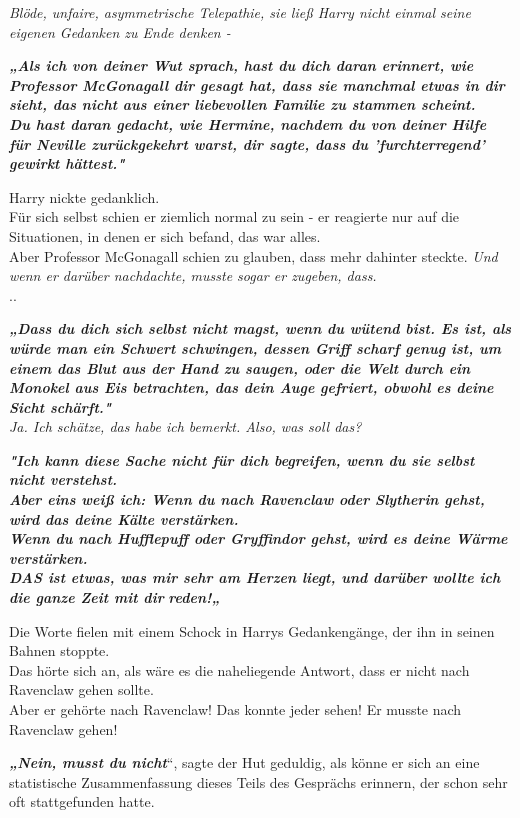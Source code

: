 {\emph{Blöde, unfaire, asymmetrische Telepathie, sie ließ Harry nicht einmal seine eigenen Gedanken zu Ende denken -}

\textbf{\emph{„Als ich von deiner Wut sprach, hast du dich daran erinnert, wie Professor McGonagall dir gesagt hat, dass sie manchmal etwas in dir sieht, das nicht aus einer liebevollen Familie zu stammen scheint.\\ Du hast daran gedacht, wie Hermine, nachdem du von deiner Hilfe für Neville zurückgekehrt warst, dir sagte, dass du 'furchterregend' gewirkt hättest."}}

Harry nickte gedanklich.\\ Für sich selbst schien er ziemlich normal zu sein - er reagierte nur auf die Situationen, in denen er sich befand, das war alles.\\ Aber Professor McGonagall schien zu glauben, dass mehr dahinter steckte. \emph{Und wenn er darüber nachdachte, musste sogar er zugeben, dass.}\\ ..

\textbf{\emph{„Dass du dich sich selbst nicht magst, wenn du wütend bist. Es ist, als würde man ein Schwert schwingen, dessen Griff scharf genug ist, um einem das Blut aus der Hand zu saugen, oder die Welt durch ein Monokel aus Eis betrachten, das dein Auge gefriert, obwohl es deine Sicht schärft."}}\\ \emph{\hfill\break Ja. Ich schätze, das habe ich bemerkt. Also, was soll das?}

\textbf{\emph{"Ich kann diese Sache nicht für dich begreifen, wenn du sie selbst nicht verstehst.\\ Aber eins weiß ich: Wenn du nach Ravenclaw oder Slytherin gehst, wird das deine Kälte verstärken.}}\\ \textbf{\emph{Wenn du nach Hufflepuff oder Gryffindor gehst, wird es deine Wärme verstärken.\\ DAS ist etwas, was mir sehr am Herzen liegt, und darüber wollte ich die ganze Zeit mit dir}} \textbf{\emph{reden!„}}

Die Worte fielen mit einem Schock in Harrys Gedankengänge, der ihn in seinen Bahnen stoppte.\\ Das hörte sich an, als wäre es die naheliegende Antwort, dass er nicht nach Ravenclaw gehen sollte.\\ Aber er gehörte nach Ravenclaw! Das konnte jeder sehen! Er musste nach Ravenclaw gehen!

\textbf{\emph{„Nein, musst du nicht}}“, sagte der Hut geduldig, als könne er sich an eine statistische Zusammenfassung dieses Teils des Gesprächs erinnern, der schon sehr oft stattgefunden hatte.

}

